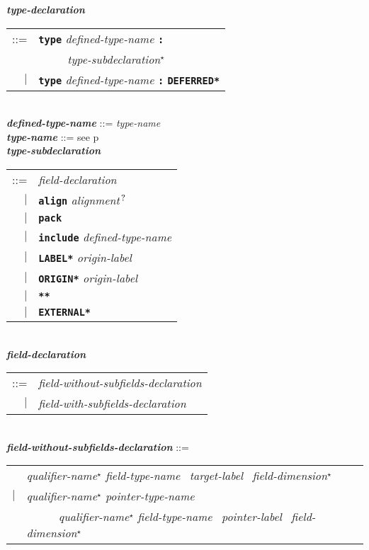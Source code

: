 \documentclass[12pt]{article}
\newcommand{\TT}[1]{{\tt \bfseries #1}}
\newcommand{\STAR}{{\Large $^\star$}}
\newcommand{\QMARK}{{$^{\,\mbox{\footnotesize ?}}$}}
\newcommand{\ttkey}[1]{{\tt \bfseries #1}}
\newcommand{\emkey}[1]{{\em \bfseries #1}}
\newcommand{\pagref}[1]{p\pageref{#1}}
\newenvironment{indpar}[1][0.3in]%
	{\begin{list}{}%
		     {\setlength{\itemsep}{0in}%
		      \setlength{\topsep}{0in}%
		      \setlength{\parsep}{1ex}%
		      \setlength{\labelwidth}{#1}%
		      \setlength{\leftmargin}{#1}%
		      \addtolength{\leftmargin}{\labelsep}}%
	 \item}%
	{\end{list}}
\begin{document}
\begin{indpar}
\emkey{type-declaration}\label{TYPE-DECLARATION}
    \begin{tabular}[t]{rl}
    ::= & \ttkey{type} {\em defined-type-name} \TT{:} \\
	& \TT{~~~~~}{\em type-subdeclaration}\STAR{} \\
    $|$ & \ttkey{type} {\em defined-type-name} \TT{:} \ttkey{*DEFERRED*} \\
    \end{tabular} \\
\emkey{defined-type-name} ::= {\em type-name} \\
\emkey{type-name} ::= see \pagref{TYPE-NAME}
\\[2ex]
\emkey{type-subdeclaration}
    \begin{tabular}[t]{@{}rl}
    ::= &  {\em field-declaration} \\
    $|$ &  \ttkey{align} {\em alignment}\QMARK{} \\
    $|$ &  \ttkey{pack} \\
    $|$ &  \ttkey{include} {\em defined-type-name} \\
    $|$ &  \ttkey{*LABEL*} {\em origin-label} \\
    $|$ &  \ttkey{*ORIGIN*} {\em origin-label} \\
    $|$ &  \ttkey{***} \\
    $|$ &  \ttkey{*EXTERNAL*} \\
    \end{tabular}
\\[2ex]
\emkey{field-declaration}
    \begin{tabular}[t]{@{}rl}
    ::= &  {\em field-without-subfields-declaration} \\
    $|$ &  {\em field-with-subfields-declaration} \\
    \end{tabular}
\\[2ex]
\emkey{field-without-subfields-declaration} ::= \\
\hspace*{0.5in}\begin{tabular}{rl}
        & {\em qualifier-name}\STAR{} {\em field-type-name}~
          {\em target-label}~ {\em field-dimension}\STAR{} \\
    $|$ & {\em qualifier-name}\STAR{} {\em pointer-type-name} \\
        & ~~~~~ {\em qualifier-name}\STAR{} {\em field-type-name}~
                {\em pointer-label}~ {\em field-dimension}\STAR{}

\end{tabular}
\end{indpar}
\end{document}
